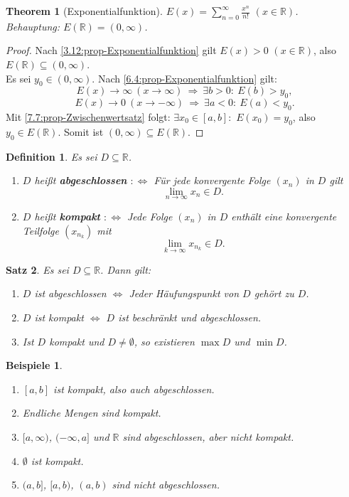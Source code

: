\documentclass[12pt]{extreport} %
\newcommand{\R}{\mathbb{R}}
\theoremstyle{named}
\newtheorem{unnamedtheorem}{Theorem} \counterwithin{unnamedtheorem}{chapter}
\theoremstyle{itshape}
\newtheorem{satz}[unnamedtheorem]{Satz}
\newtheorem*{definition}{Definition}
\theoremstyle{normal}
\newtheorem*{beispiele}{Beispiele}
\begin{document}
\begin{unnamedtheorem}[Exponentialfunktion]
	$E(x) = \sum_{n=0}^{\infty} \frac{x^{n}}{n!}$ $(x \in \R)$. \\
	Behauptung: $E(\R) = (0, \infty)$.	
\end{unnamedtheorem}

\begin{proof}
	Nach \ref{3.12:prop-Exponentialfunktion} gilt $E(x) > 0$ $(x \in \R)$, also $E(\R) \subseteq (0, \infty)$. \\
	Es sei $y_{0} \in (0, \infty)$. Nach \ref{6.4:prop-Exponentialfunktion} gilt:
	$$ E(x) \rightarrow \infty ~ (x \rightarrow \infty) ~ \Rightarrow ~ \exists b > 0: ~ E(b) > y_{0}, $$	
	$$ E(x) \rightarrow 0 ~ (x \rightarrow -\infty) ~ \Rightarrow  ~ \exists a < 0: ~ E(a) < y_{0}. $$
	Mit \ref{7.7:prop-Zwischenwertsatz} folgt: $\exists x_{0} \in [a, b]:$ $E(x_{0}) = y_{0}$, also $y_{0} \in E(\R)$.
	Somit ist $(0, \infty) \subseteq E(\R)$.
\end{proof}

 
\begin{definition}
	Es sei $D \subseteq \R$.
	\begin{enumerate}
		\item $D$ hei{\ss}t \textbf{abgeschlossen} $:\iff$ Für jede konvergente Folge $(x_{n})$ in $D$ gilt $$\lim_{n \to \infty} x_{n} \in D.$$
		\item $D$ hei{\ss}t \textbf{kompakt} $:\iff$ Jede Folge $(x_{n})$ in $D$ enthält eine konvergente Teilfolge $(x_{n_{k}})$ mit 
		$$\lim_{k \rightarrow \infty} x_{n_{k}} \in D.$$
	\end{enumerate}
\end{definition}


\begin{satz} \label{7.10:satz}
	Es sei $D \subseteq \R$. Dann gilt:
	\begin{enumerate}
		\item $D$ ist abgeschlossen $\iff$ Jeder Häufungspunkt von $D$ gehört zu $D$.
		\item $D$ ist kompakt $\iff$ $D$ ist beschränkt und abgeschlossen.
		\item Ist $D$ kompakt und $D \neq \emptyset$, so existieren $\max D$ und $\min D$.
	\end{enumerate}
\end{satz}

\begin{beispiele} ~\
	\begin{enumerate}
		\item $[a, b]$ ist kompakt, also auch abgeschlossen.	
		\item Endliche Mengen sind kompakt.
		\item $[a, \infty)$, $(-\infty, a]$ und $\R$ sind abgeschlossen, aber nicht kompakt.
		\item $\emptyset$ ist kompakt.
		\item $(a, b]$, $[a, b)$, $(a, b)$ sind nicht abgeschlossen.
	\end{enumerate}
\end{beispiele}
\end{document}
